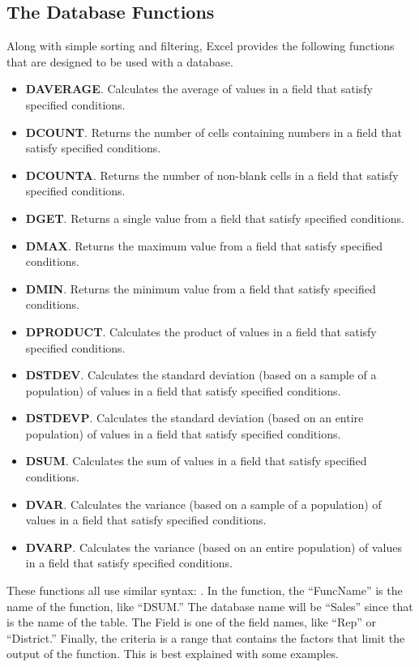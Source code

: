 \subsection{The Database Functions}

Along with simple sorting and filtering, Excel provides the following functions that are designed to be used with a database. 

\begin{itemize}
	\item \textbf{DAVERAGE}. Calculates the average of values in a field that satisfy specified conditions.
	\item \textbf{DCOUNT}. Returns the number of cells containing numbers in a field that satisfy specified conditions.
	\item \textbf{DCOUNTA}. Returns the number of non-blank cells in a field that satisfy specified conditions.
	\item \textbf{DGET}. Returns a single value from a field that satisfy specified conditions.
	\item \textbf{DMAX}. Returns the maximum value from a field that satisfy specified conditions.
	\item \textbf{DMIN}. Returns the minimum value from a field that satisfy specified conditions.
	\item \textbf{DPRODUCT}. Calculates the product of values in a field that satisfy specified conditions.
	\item \textbf{DSTDEV}. Calculates the standard deviation (based on a sample of a population) of values in a field that satisfy specified conditions.
	\item \textbf{DSTDEVP}. Calculates the standard deviation (based on an entire population) of values in a field that satisfy specified conditions.
	\item \textbf{DSUM}. Calculates the sum of values in a field that satisfy specified conditions.
	\item \textbf{DVAR}. Calculates the variance (based on a sample of a population) of values in a field that satisfy specified conditions.
	\item \textbf{DVARP}. Calculates the variance (based on an entire population) of values in a field that satisfy specified conditions.
\end{itemize}

These functions all use similar syntax: . In the function, the ``FuncName'' is the name of the function, like ``DSUM.'' The database name will be ``Sales'' since that is the name of the table. The Field is one of the field names, like ``Rep'' or ``District.'' Finally, the criteria is a range that contains the factors that limit the output of the function. This is best explained with some examples.

